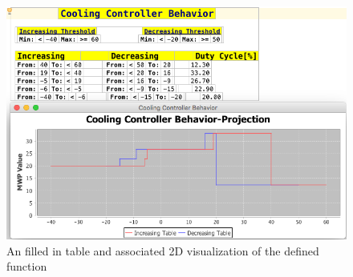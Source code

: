 \begin{figure}[!h]
\centering
\includegraphics[width=.7\textwidth]{./figures/DiehlTableAnd2DGraph.png}
\caption{An filled in table and associated 2D visualization of the defined
function}
\label{fig:FAU_behavior_2d}
\end{figure}




  



